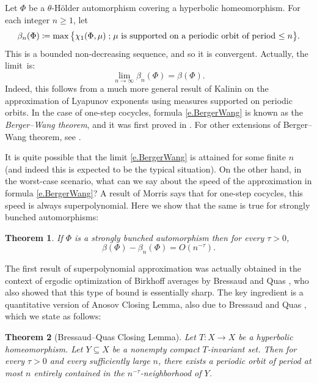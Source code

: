 \documentclass[JEP,XML,SOM,Unicode]{cedram}
\def\vcentcolon{\mathrel{\mathop\ordinarycolon}}
\providecommand\ordinarycolon{:}
\providecommand*\coloneqq{\vcentcolon\mathrel{\mkern-1.2mu}=}
\theoremstyle{plain}
\newtheorem{theorem}{Theorem}[section]
\theoremstyle{definition}
\newcommand{\st}{\;\mathord{;}\;}
\begin{document}

Let $\Phi$ be a $\theta$\nobreakdash-Hölder automorphism covering a hyperbolic homeomorphism.
For each integer \hbox{$n \ge 1$}, let
\[
\beta_n(\Phi) \coloneqq \max \big\{\chi_1(\Phi, \mu) \st \text{$\mu$ is supported on a periodic orbit of period $\le n$} \big\}.
\]
This is a bounded non-decreasing sequence,
and so it is convergent.
Actually, the limit~is:
\begin{equation}\label{e.BergerWang}
\lim_{n \to \infty} \beta_n(\Phi) = \beta(\Phi).
\end{equation}
Indeed, this follows from a much more general result of Kalinin \cite[Th.\,1.4]{Kalinin} on the approximation of Lyapunov exponents using measures supported on periodic orbits.
In the case of one-step cocycles, formula \eqref{e.BergerWang} is known as the \emph{Berger--Wang theorem}, and it was first proved in \cite{BWang}.
For other extensions of Berger--Wang theorem, see \cite{Oregon,BreuF}.

It is quite possible that the limit \eqref{e.BergerWang} is attained for some finite $n$ (and indeed this is expected to be the typical situation).
On the other hand, in the worst-case scenario, what can we say about the speed of the approximation in formula \eqref{e.BergerWang}?
A result of Morris \cite{Morris_rapidly} says that for one-step cocycles, this speed is always superpolynomial.
Here we show that the same is true for strongly bunched automorphisms:

\begin{theorem}\label{t.super_pol}
If $\Phi$ is a strongly bunched automorphism then for every $\tau>0$,
\[
\beta(\Phi) - \beta_n(\Phi) = O(n^{-\tau}).
\]
\end{theorem}

The first result of superpolynomial approximation was actually obtained in the context of ergodic optimization of Birkhoff averages by Bressaud and Quas \cite{BQuas}, who also showed that this type of bound is essentially sharp.
The key ingredient is a quantitative version of Anosov Closing Lemma, also due to Bressaud and Quas \cite{BQuas}, which we state as follows:

\begin{theorem}[Bressaud--Quas Closing Lemma]\label{t.BQ}
Let $T \colon X \to X$ be a hyperbolic homeomorphism.
Let $Y \subseteq X$ be a nonempty compact $T$-invariant set.
Then for every $\tau>0$ and every sufficiently large $n$, there exists a periodic orbit of period at most $n$ entirely contained in the $n^{-\tau}$-neighborhood of $Y$.
\end{theorem}
\end{document}
